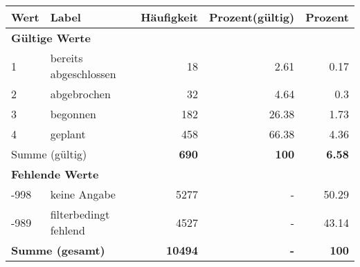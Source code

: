      \begin{longtable}{lXrrr}
     \toprule
     \textbf{Wert} & \textbf{Label} & \textbf{Häufigkeit} & \textbf{Prozent(gültig)} & \textbf{Prozent} \\
     \endhead
     \midrule
     \multicolumn{5}{l}{\textbf{Gültige Werte}}\\

     1 &
     \multicolumn{1}{X}{ bereits abgeschlossen   } &


       \num{18} &
       \num[round-mode=places,round-precision=2]{2.61} &
         \num[round-mode=places,round-precision=2]{0.17} \\

     2 &
     \multicolumn{1}{X}{ abgebrochen   } &


       \num{32} &
       \num[round-mode=places,round-precision=2]{4.64} &
         \num[round-mode=places,round-precision=2]{0.3} \\

     3 &
     \multicolumn{1}{X}{ begonnen   } &


       \num{182} &
       \num[round-mode=places,round-precision=2]{26.38} &
         \num[round-mode=places,round-precision=2]{1.73} \\

     4 &
     \multicolumn{1}{X}{ geplant   } &


       \num{458} &
       \num[round-mode=places,round-precision=2]{66.38} &
         \num[round-mode=places,round-precision=2]{4.36} \\
     \midrule
     \multicolumn{2}{l}{Summe (gültig)} &
       \textbf{\num{690}} &
     \textbf{\num{100}} &
       \textbf{\num[round-mode=places,round-precision=2]{6.58}} \\
     \multicolumn{5}{l}{\textbf{Fehlende Werte}}\\
       -998 &
       keine Angabe &
         \num{5277} &
        - &
         \num[round-mode=places,round-precision=2]{50.29} \\
       -989 &
       filterbedingt fehlend &
         \num{4527} &
        - &
         \num[round-mode=places,round-precision=2]{43.14} \\
     \midrule
     \multicolumn{2}{l}{\textbf{Summe (gesamt)}} &
          \textbf{\num{10494}} &
        \textbf{-} &
        \textbf{\num{100}} \\
     \bottomrule
     \end{longtable}
     
